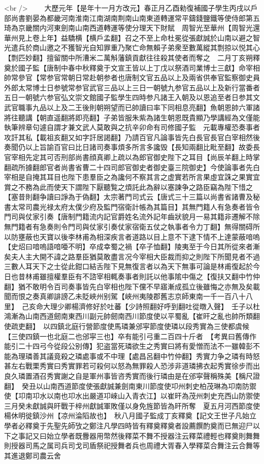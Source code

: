 <br />
　　大歷元年【是年十一月方改元】春正月乙酉勑復補國子學生丙戌以戶部尚書劉晏為都畿河南淮南江南湖南荆南山南東道轉運常平鑄錢鹽鐵等使侍郎第五琦為京畿關内河東劍南山南西道轉運等使分理天下財賦　周智光至華州【周智光還華州見上卷上年】益驕横【横戶孟翻】召之不至上命杜冕從張獻誠於山南以避之智光遣兵於商山邀之不獲智光自知罪重乃聚亡命無賴子弟衆至數萬縱其剽掠以悦其心【剽匹妙翻】擅留關中所漕米二萬斛藩鎮貢獻往往殺其使者而奪之　二月丁亥朔釋奠於國子監【唐制中春中秋釋奠于文宣王皆以上丁戊以祭酒司業博士三獻】命宰相帥常參官【常参官常朝日常赴朝参者也唐制文官五品以上及兩省供奉官監察御史員外郎太常博士日参號常参官武官三品以上三日一朝號九参官五品以上及新行當番者五日一朝號六参官弘文崇文館國子監學生四時参凡諸王入朝及以恩追至者日参其文武官職事九品以上及二王後則朝朔望而已帥讀曰率下同相息亮翻】魚朝恩帥六軍諸將往聽講【朝直遥翻將即亮翻】子弟皆服朱紫為諸生朝恩既貴顯乃學講經為文僅能執筆辨章句遽自謂才兼文武人莫敢與之抗辛卯命有司修國子監　元載專權恐奏事者攻訐其私【載祖亥翻又如字訐居謁翻】乃請百官凡論事皆先白長官長官白宰相然後奏聞仍以上旨諭百官曰比日諸司奏事煩多所言多讒毁【長知兩翻比毗至翻】故委長官宰相先定其可否刑部尚書顔真卿上疏以為郎官御史陛下之耳目【尚辰羊翻上時掌翻疏所據翻郎官者尚書省曹二十四司郎官御史者御史臺三院御史】今使論事者先白宰相是自掩其耳目也陛下患羣臣之為讒何不察其言之虚實若所言果虛宜誅之果實宜賞之不務為此而使天下謂陛下厭聽覧之煩託此為辭以塞諫争之路臣竊為陛下惜之【塞昔則翻争讀曰諍為于偽翻】太宗著門司式云【唐式三十三篇以尚書省諸曹及秘書太常司農光禄太府太僕少府及監門宿衛計帳為其篇目】其無門籍人有急奏者皆令門司與仗家引奏【唐制門籍流内記官爵姓名流外記年齒狀貌月一易其籍非遷解不除無門籍者有急奏則令門司與仗家引奏仗家宿衛五仗之執事者令力丁翻】無得關碍所以防壅蔽也天寶以後李林甫為相深疾言者道路以目上意不下逮下情不上達蒙蔽喑嗚【史炤曰喑嗚語喑唖不明】卒成幸蜀之禍【卒子恤翻】陵夷至于今日其所從來者漸矣夫人主大開不諱之路羣臣猶莫敢盡言况今宰相大臣裁而抑之則陛下所聞見者不過三數人耳天下之士從此鉗口結舌陛下見無復言者以為天下無事可論是林甫復起於今日也昔林甫雖擅權羣臣有不諮宰相輒奏事者則託以他事隂中傷之【復扶又翻中竹仲翻】猶不敢明令百司奏事皆先白宰相也陛下儻不早寤漸成孤立後雖悔之亦無及矣載聞而恨之奏真卿誹謗乙未貶峽州别駕【峽州夷陵郡舊志京師東南一千一百八十八里】　己亥命大理少卿楊濟修好於吐蕃【少詩照翻好呼到翻吐從暾入聲】　壬子以杜鴻漸為山南西道劒南東西川副元帥劒南西川節度使以平蜀亂【崔旰之亂也帥所類翻使疏吏翻】　以四鎮北庭行營節度使馬璘兼邠寜節度使璘以段秀實為三使都虞候【三使四鎮一也北庭二也邠寜三也】卒有能引弓重二百四十斤者　【考異曰舊傳作能引二十四弓今從段公别傳】犯盗當死璘欲生之秀實曰將有愛憎而法不一雖韓彭不能為理璘善其議竟殺之璘處事或不中理【處昌呂翻中竹仲翻】秀實力争之璘有時怒甚左右戰栗秀實曰秀實罪若可殺何以怒為無罪殺人恐涉非道璘拂衣起秀實徐步而出良久璘置酒召秀實謝之自是軍州事皆咨秀實而後行璘由是在邠寜聲稱殊美【稱尺證翻】　癸丑以山南西道節度使張獻誠兼劍南東川節度使卭州刺史柏茂琳為卭南防禦使【卭南卭水以南也卭水出嚴道卭崍山入青衣江】以崔旰為茂州刺史充西山防禦使三月癸未獻誠與旰戰于梓州獻誠軍敗僅以身免旌節皆為旰所奪　夏五月河西節度使楊休明徙鎮沙州【凉州淪䧟故也】　秋八月國子監成丁亥釋奠【記文王世子凡始立學者必釋奠于先聖先師攷之鄭注凡學四時皆有釋奠釋奠者設薦饌酌奠而已無迎尸以下之事記又曰始立學者既釁器用幣然後釋菜不舞不授器注云釋菜禮輕也釋奠則舞舞則授器司馬之属司兵司戈司盾祭祀授舞者兵也周禮大胥春入學釋菜合舞注云合舞等其進退鄭司農云舍